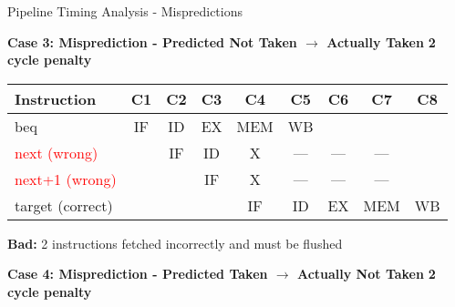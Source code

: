 \documentclass[aspectratio=169,12pt]{beamer}
\newcommand{\xmark}{\ding{55}} %
\begin{document}
\begin{frame}{Pipeline Timing Analysis - Mispredictions}
\scriptsize
\vspace{0.1cm}

\begin{center}
\colorbox{red!10}{
\begin{minipage}{0.95\textwidth}
\textbf{Case 3: Misprediction - Predicted Not Taken $\rightarrow$ Actually Taken} \hfill \textcolor{red!70!black}{\textbf{2 cycle penalty} \xmark}
\vspace{0.1cm}

\begin{tabular}{l|c|c|c|c|c|c|c|c}
\textbf{Instruction} & \textbf{C1} & \textbf{C2} & \textbf{C3} & \textbf{C4} & \textbf{C5} & \textbf{C6} & \textbf{C7} & \textbf{C8} \\
\hline
beq & \cellcolor{normalexec!40}IF & \cellcolor{normalexec!40}ID & \cellcolor{normalexec!40}EX & \cellcolor{normalexec!40}MEM & \cellcolor{normalexec!40}WB & & & \\
\textcolor{red}{next (wrong)} & & \cellcolor{normalexec!40}IF & \cellcolor{flushcolor!40}ID & \cellcolor{flushcolor!40}\textsf{X} & \cellcolor{emptycolor}--- & \cellcolor{emptycolor}--- & \cellcolor{emptycolor}--- & \\
\textcolor{red}{next+1 (wrong)} & & & \cellcolor{flushcolor!40}IF & \cellcolor{flushcolor!40}\textsf{X} & \cellcolor{emptycolor}--- & \cellcolor{emptycolor}--- & \cellcolor{emptycolor}--- & \\
target (correct) & & & & \cellcolor{normalexec!40}IF & \cellcolor{normalexec!40}ID & \cellcolor{normalexec!40}EX & \cellcolor{normalexec!40}MEM & \cellcolor{normalexec!40}WB \\
\end{tabular}

\vspace{0.05cm}
\footnotesize \textbf{Bad:} 2 instructions fetched incorrectly and must be flushed
\end{minipage}
}
\end{center}

\vspace{0.2cm}

\begin{center}
\colorbox{red!10}{
\begin{minipage}{0.95\textwidth}
\textbf{Case 4: Misprediction - Predicted Taken $\rightarrow$ Actually Not Taken} \hfill \textcolor{red!70!black}{\textbf{2 cycle penalty} \xmark}
\vspace{0.1cm}


\end{minipage}}
\end{center}
\end{frame}
\end{document}
